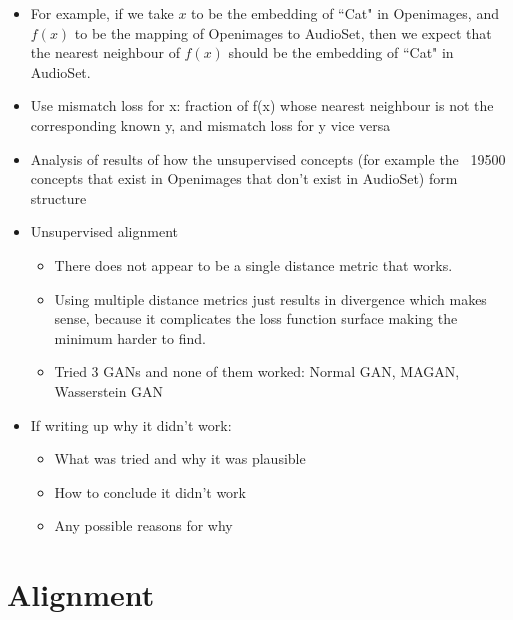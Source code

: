 \begin{itemize}
    \item For example, if we take $x$ to be the embedding of ``Cat"  in Openimages, and $f(x)$ to be the mapping of Openimages to AudioSet, then we expect that the nearest neighbour of $f(x)$ should be the embedding of ``Cat" in AudioSet. 
    \item Use mismatch loss for x: fraction of f(x) whose nearest neighbour is not the corresponding known y, and mismatch loss for y vice versa
    \item Analysis of results of how the unsupervised concepts (for example the ~19500 concepts that exist in Openimages that don't exist in AudioSet) form structure
\end{itemize}


\begin{itemize}
    \item Unsupervised alignment
    \begin{itemize}
        \item There does not appear to be a single distance metric that works. 
        \item Using multiple distance metrics just results in divergence which makes sense, because it complicates the loss function surface making the minimum harder to find. 
        \item Tried 3 GANs and none of them worked: Normal GAN, MAGAN, Wasserstein GAN
    \end{itemize}
    \item If writing up why it didn't work:
    \begin{itemize}
        \item What was tried and why it was plausible
        \item How to conclude it didn't work
        \item Any possible reasons for why
    \end{itemize}
\end{itemize}

\section{Alignment}

